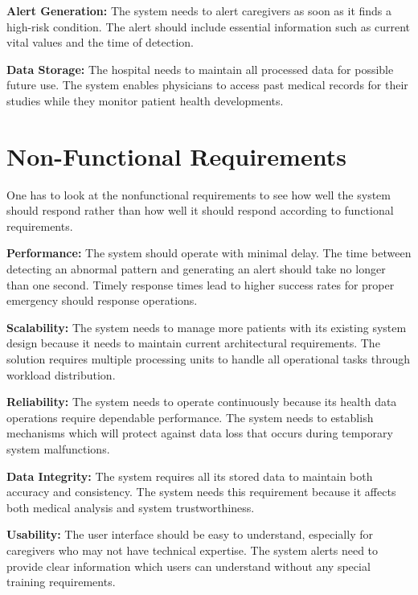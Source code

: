 \documentclass[12pt, a4paper, oneside]{report}
\newcommand{\chapterpage}[2]{%
    \cleardoublepage
    \thispagestyle{empty}
    \vspace*{\fill}
    \begin{center}
        \huge \textbf{Chapter #1} \\
        \vspace{1cm}
        \Huge #2
    \end{center}
    \vspace*{\fill}
    \newpage
}
\begin{document}
\textbf{Alert Generation:}  
The system needs to alert caregivers as soon as it finds a high-risk condition. The alert should include essential information such as current vital values and the time of detection.

\textbf{Data Storage:}  
The hospital needs to maintain all processed data for possible future use. The system enables physicians to access past medical records for their studies while they monitor patient health developments.

\section{Non-Functional Requirements}

One has to look at the nonfunctional requirements to see how well the system should respond rather than how well it should respond according to functional requirements.

\textbf{Performance:}  
The system should operate with minimal delay. The time between detecting an abnormal pattern and generating an alert should take no longer than one second. Timely response times lead to higher success rates for proper emergency should response operations.

\textbf{Scalability:}  
The system needs to manage more patients with its existing system design because it needs to maintain current architectural requirements. The solution requires multiple processing units to handle all operational tasks through workload distribution.

\textbf{Reliability:}  
The system needs to operate continuously because its health data operations require dependable performance. The system needs to establish mechanisms which will protect against data loss that occurs during temporary system malfunctions.

\textbf{Data Integrity:}  
The system requires all its stored data to maintain both accuracy and consistency. The system needs this requirement because it affects both medical analysis and system trustworthiness.

\textbf{Usability:}  
The user interface should be easy to understand, especially for caregivers who may not have technical expertise. The system alerts need to provide clear information which users can understand without any special training requirements.


\end{document}

